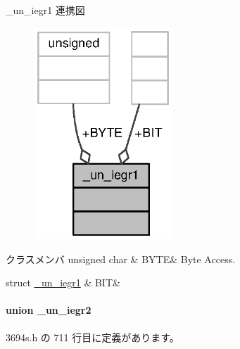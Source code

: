 \+\_\+un\+\_\+iegr1 連携図
\nopagebreak
\begin{figure}[H]
\begin{center}
\leavevmode
\includegraphics[width=148pt]{d4/d62/union__un__iegr1__coll__graph}
\end{center}
\end{figure}
\begin{DoxyFields}{クラスメンバ}
unsigned char\label{3694s_8h_a4feb4c4e2c14fbb003d4fbadf9138a60}
&
B\+Y\+T\+E&
Byte Access. \\
\hline

struct \hyperlink{3694s_8h_d6/d7c/struct__un__iegr1_8BIT}{\+\_\+un\+\_\+iegr1}\label{3694s_8h_a64004affe73a481d455a44efdd75625e}
&
B\+I\+T&
\\
\hline

\end{DoxyFields}
\label{union__un__iegr2}
\paragraph{union \+\_\+un\+\_\+iegr2}


 3694s.\+h の 711 行目に定義があります。




